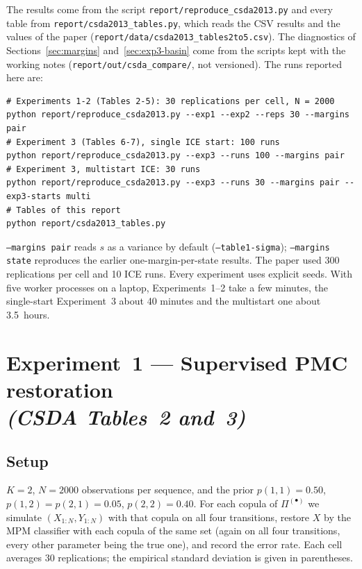 \documentclass[11pt,a4paper]{article}
\begin{document}
The results come from the script \nolinkurl{report/reproduce_csda2013.py} and
every table from \nolinkurl{report/csda2013_tables.py}, which reads the CSV
results and the values of the paper
(\nolinkurl{report/data/csda2013_tables2to5.csv}). The diagnostics of
Sections~\ref{sec:margins} and~\ref{sec:exp3-basin} come from the scripts
kept with the working notes (\nolinkurl{report/out/csda_compare/}, not
versioned). The runs
reported here are:
\begin{lstlisting}
# Experiments 1-2 (Tables 2-5): 30 replications per cell, N = 2000
python report/reproduce_csda2013.py --exp1 --exp2 --reps 30 --margins pair
# Experiment 3 (Tables 6-7), single ICE start: 100 runs
python report/reproduce_csda2013.py --exp3 --runs 100 --margins pair
# Experiment 3, multistart ICE: 30 runs
python report/reproduce_csda2013.py --exp3 --runs 30 --margins pair --exp3-starts multi
# Tables of this report
python report/csda2013_tables.py
\end{lstlisting}
\texttt{--margins pair} reads $s$ as a variance by default
(\texttt{--table1-sigma}); \texttt{--margins state} reproduces the earlier
one-margin-per-state results. The paper used 300 replications per
cell and 10 ICE runs. Every experiment uses explicit seeds. With five worker processes on a laptop,
Experiments~1--2 take a few minutes, the
single-start Experiment~3 about 40 minutes and the multistart one about
3.5~hours.

\section{Experiment~1 --- Supervised PMC restoration\\
        \emph{(CSDA Tables~2 and~3)}}\label{sec:exp1}

\subsection{Setup}

$K=2$, $N=2000$ observations per sequence, and the prior
$p(1,1)=0.50$, $p(1,2)=p(2,1)=0.05$, $p(2,2)=0.40$. For each copula of
$\Pi^{(\bullet)}$ we simulate $(X_{1:N},Y_{1:N})$ with that copula on all four
transitions, restore $X$ by the MPM classifier with each copula of the same
set (again on all four transitions, every other parameter being the true
one), and record the error rate. Each cell averages 30 replications; the
empirical standard deviation is given in parentheses.
\end{document}

